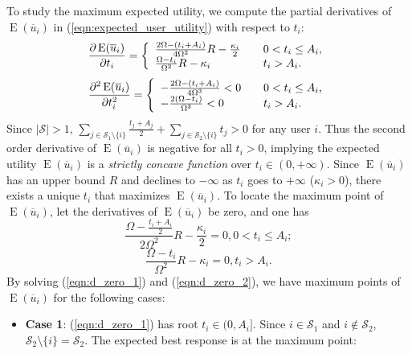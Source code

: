 \documentclass{IEEEtran}
\begin{document}
\begin{IEEEproof}
To study the maximum expected utility, we compute the partial derivatives of $\operatorname{E}(\overline{u}_i)$ in (\ref{eqn:expected_user_utility}) with respect to $t_i$:
\begin{equation}
\label{eqn:d_u}
\frac{\partial \operatorname{E}(\overline{u}_i)}{\partial t_i}=\left\{
\begin{array}{l l}
\frac{2\Omega-(t_i+A_i)}{4\Omega^2}R-\frac{\kappa_i}{2} & \quad \text{$0 < t_i \leq A_i$,}\\
\frac{\Omega-t_i}{\Omega^2}R-\kappa_i & \quad \text{$t_i > A_i$.}
\end{array}\right.
\end{equation}
\begin{equation}
\label{eqn:d2_u}
\frac{\partial^2 \operatorname{E}(\overline{u}_i)}{\partial t_i^2}=\left\{
\begin{array}{l l}
-\frac{2\Omega-(t_i+A_i)}{4\Omega^3}<0 & \quad \text{$0 < t_i \leq A_i$,}\\
-\frac{2(\Omega-t_i)}{\Omega^3}<0 & \quad \text{$t_i > A_i$.}
\end{array}\right.
\end{equation}
Since $|\mathcal{S}|>1$, $\sum_{j\in \mathcal{S}_1\setminus\{i\}}\frac{t_j+A_j}{2}+\sum_{j\in \mathcal{S}_2\setminus\{i\}}t_j>0$ for any user $i$. Thus the second order derivative of $\operatorname{E}(\overline{u}_i)$ is negative for all $t_i>0$, implying the expected utility $\operatorname{E}(\overline{u}_i)$ is a \emph{strictly concave function} over $t_i \in (0,+\infty)$. Since $\operatorname{E}(\overline{u}_i)$ has an upper bound $R$ and declines to $-\infty$ as $t_i$ goes to $+\infty$ ($\kappa_i>0$), there exists a unique $t_i$ that maximizes $\operatorname{E}(\overline{u}_i)$. To locate the maximum point of $\operatorname{E}(\overline{u}_i)$, let the derivatives of $\operatorname{E}(\overline{u}_i)$ be zero, and one has
\begin{equation}
\label{eqn:d_zero_1}
\frac{\Omega-\frac{t_i+A_i}{2}}{2\Omega^2}R-\frac{\kappa_i}{2}=0,0 < t_i \leq A_i;
\end{equation}
\begin{equation}
\label{eqn:d_zero_2}
\frac{\Omega-t_i}{\Omega^2}R-\kappa_i=0, t_i > A_i.
\end{equation}
By solving (\ref{eqn:d_zero_1}) and (\ref{eqn:d_zero_2}), we have maximum points of $\operatorname{E}(\overline{u}_i)$ for the following cases:
\begin{itemize}
\item {\bf Case 1}: (\ref{eqn:d_zero_1}) has root $t_i\in (0,A_i]$. Since $i\in\mathcal{S}_1$ and $i\notin\mathcal{S}_2$, $\mathcal{S}_2\setminus\{i\}=\mathcal{S}_2$. The expected best response is at the maximum point:

\end{itemize}
\end{IEEEproof}
\end{document}
